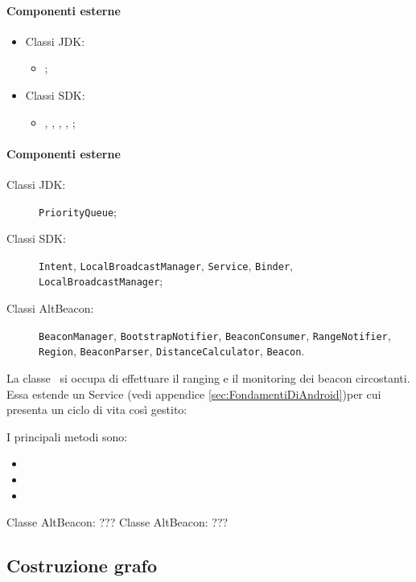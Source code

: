 \documentclass[../Funzionalita.tex]{subfiles}
\begin{document}
			\paragraph*{Componenti esterne}
			\begin{itemize}
				\item Classi JDK:
				\begin{itemize}
					\item \PriorityQueue;
				\end{itemize}
				\item Classi SDK:
				\begin{itemize}
					\item \Intent, \LocalBroadcastManager, \Service, \Binder, \LocalBroadcastManager;
				\end{itemize}
			\end{itemize}
			
			\paragraph*{Componenti esterne}
			\begin{description}
				\item[Classi JDK:] \verb|PriorityQueue|;
				\item[Classi SDK:] \verb|Intent|, \verb|LocalBroadcastManager|, \verb|Service|, \verb|Binder|, \\ \verb|LocalBroadcastManager|;
				\item[Classi AltBeacon:] \verb|BeaconManager|, \verb|BootstrapNotifier|, \verb|BeaconConsumer|, \verb|RangeNotifier|, \verb|Region|, \verb|BeaconParser|,  \verb|DistanceCalculator|, \verb|Beacon|.
			\end{description}
			
			
			La classe \BeaconManagerAdapter\ si occupa di effettuare il ranging e il monitoring dei beacon circostanti. 
			Essa estende un Service (vedi appendice \ref{sec:FondamentiDiAndroid})per cui presenta un ciclo di vita così gestito:
			
			
			
			
			
			
			I principali metodi sono:
			\begin{itemize}
				\item 
				\item 
				\item 
			\end{itemize}						
			
			Classe AltBeacon:
				???
			Classe AltBeacon:
				???
			
		\subsection{Costruzione grafo}
		
		
		
\end{document}
